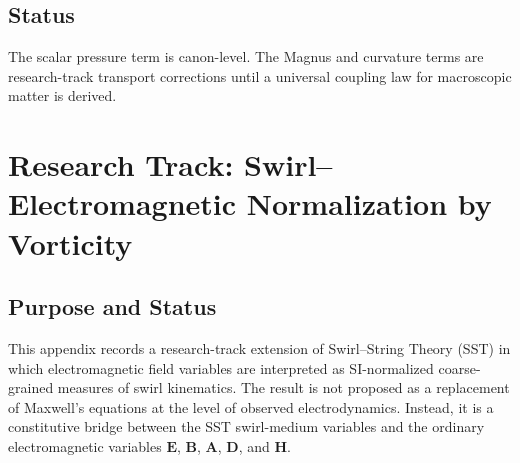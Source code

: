 \subsection{Status}
    The scalar pressure term is canon-level. The Magnus and curvature terms are
    research-track transport corrections until a universal coupling law for
    macroscopic matter is derived.
    
    

\section{Research Track: Swirl--Electromagnetic Normalization by Vorticity}
\label{app:research_swirl_em_vorticity}

\providecommand{\swirlarrow}{\boldsymbol{\circlearrowleft}}
\providecommand{\vswirl}{\mathbf{v}_{\!\boldsymbol{\circlearrowleft}}}
\providecommand{\vnorm}{\lVert\mathbf{v}_{\!\boldsymbol{\circlearrowleft}}\rVert}
\providecommand{\vchar}{v_{\!\boldsymbol{\circlearrowleft}}^{\ast}}
\providecommand{\uswirl}{\mathbf{u}_{\!\boldsymbol{\circlearrowleft}}}
\providecommand{\omegaswirl}{\boldsymbol{\omega}_{\!\boldsymbol{\circlearrowleft}}}
\providecommand{\rhoF}{\rho_{\!f}}
\providecommand{\rhoE}{\rho_{\!E}}
\providecommand{\rhoM}{\rho_{\!m}}
\providecommand{\rc}{r_c}
\providecommand{\Fmax}{F_{\max}^{\rm swirl}}

\subsection{Purpose and Status}
    
    This appendix records a research-track extension of Swirl--String Theory
    (SST) in which electromagnetic field variables are interpreted as
    SI-normalized coarse-grained measures of swirl kinematics.  The result is
    not proposed as a replacement of Maxwell's equations at the level of
    observed electrodynamics.  Instead, it is a constitutive bridge between
    the SST swirl-medium variables and the ordinary electromagnetic variables
    \(\mathbf{E}\), \(\mathbf{B}\), \(\mathbf{A}\), \(\mathbf{D}\), and
    \(\mathbf{H}\).
    
